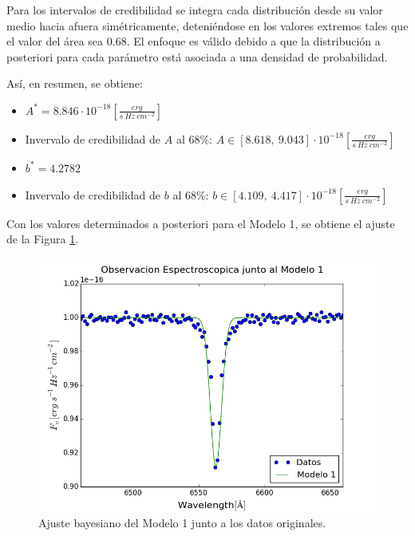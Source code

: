 \documentclass{article}
\begin{document}
Para los intervalos de credibilidad se integra cada distribución desde su valor medio hacia afuera simétricamente, deteniéndose en los valores extremos tales que el valor del área sea 0.68. El enfoque es válido debido a que la distribución a posteriori para cada parámetro está asociada a una densidad de probabilidad.

Así, en resumen, se obtiene:

\begin{itemize}
  \item $A^* = 8.846 \cdot 10^{-18} [\frac{erg}{s\ Hz\ cm^{-2}}]$

  \item Invervalo de credibilidad de $A$ al 68\%: $A \in [8.618,\  9.043] \cdot 10^{-18} [\frac{erg}{s\ Hz\ cm^{-2}}]$

  \item $b^* = 4.2782$
  
  \item Invervalo de credibilidad de $b$ al 68\%: $b \in [4.109,\  4.417] \cdot 10^{-18} [\frac{erg}{s\ Hz\ cm^{-2}}]$
  
\end{itemize}

Con los valores determinados a posteriori para el Modelo 1, se obtiene el ajuste de la Figura \ref{fig:datos_vs_modelo1}.

\clearpage
\begin{figure}[h!]
  \centering
  \includegraphics[scale = 0.5]{images/datos_vs_modelo1.png}
  \caption{Ajuste bayesiano del Modelo 1 junto a los datos originales.}
  \label{fig:datos_vs_modelo1}
\end{figure}
\end{document}
